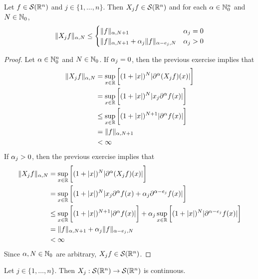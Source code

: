 \documentclass{book}
\begin{document}
	\begin{ex} 
		Let $f \in \mathcal{S}(\mathbb{R}^n)$ and $j \in \{1, \ldots, n\}$. Then $X_jf \in \mathcal{S}(\mathbb{R}^n)$ and for each $\alpha \in \mathbb{N}_0^n$ and $N \in \mathbb{N}_0$, 
		\[
		\|X_jf \|_{\alpha, N} \leq 
		\begin{cases}
			\|f\|_{\alpha, N+1} & \alpha_j = 0 \\
			\|f\|_{\alpha, N+1} + \alpha_j \|f\|_{\alpha - e_j, N} & \alpha_j > 0
		\end{cases}
		\] 
	\end{ex}
	
	\begin{proof}
		Let $\alpha  \in \mathbb{N}_0^n$ and $N \in \mathbb{N}_0$. If $\alpha_j = 0$, then the previous exercise implies that  
		\begin{align*}
			\|X_j f\|_{\alpha, N}
			& = \sup_{x \in \mathbb{R}}\bigg[ (1 + |x|)^N|\partial^{\alpha}(X_jf)(x)| \bigg] \\
			& = \sup_{x \in \mathbb{R}}\bigg[ (1 + |x|)^N|x_j\partial^{\alpha}f(x)| \bigg] \\
			& \leq \sup_{x \in \mathbb{R}}\bigg[ (1 + |x|)^{N+1}|\partial^{\alpha}f(x)| \bigg] \\
			& = \|f\|_{\alpha, N+1} \\
			& < \infty 
		\end{align*}
		If $\alpha_j > 0$, then the previous exercise implies that  
		\begin{align*}
			\|X_j f\|_{\alpha, N}
			& = \sup_{x \in \mathbb{R}}\bigg[ (1 + |x|)^N|\partial^{\alpha}(X_jf)(x)| \bigg] \\
			& = \sup_{x \in \mathbb{R}}\bigg[ (1 + |x|)^N|x_j\partial^{\alpha}f(x) + \alpha_j \partial^{\alpha - e_j} f(x)| \bigg] \\
			& \leq \sup_{x \in \mathbb{R}}\bigg[ (1 + |x|)^{N+1}|\partial^{\alpha}f(x)| \bigg] + \alpha_j \sup_{x \in \mathbb{R}}\bigg[  (1 + |x|)^N |\partial^{\alpha-e_j} f(x)| \bigg] \\
			& = \|f\|_{\alpha, N+1} + \alpha_j \|f\|_{\alpha-e_j, N} \\
			& < \infty
		\end{align*}
		Since $\alpha, N \in \mathbb{N}_0$ are arbitrary, $X_jf \in \mathcal{S}(\mathbb{R}^n)$.
	\end{proof}

	\begin{ex} 
		Let $j \in \{1, \ldots, n\}$. Then $X_j: \mathcal{S}(\mathbb{R}^n) \rightarrow \mathcal{S}(\mathbb{R}^n)$ is continuous.
	\end{ex}
\end{document}
